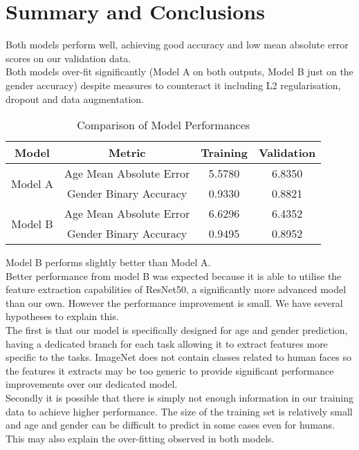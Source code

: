 \section{Summary and Conclusions}
Both models perform well, achieving good accuracy and low mean absolute error scores on our validation data.\\
Both models over-fit significantly (Model A on both outputs, Model B just on the gender accuracy) despite measures to counteract it including L2 regularisation, dropout and data augmentation.

\begin{table}[h!]
    \centering
    \begin{tabular}[h]{c|c|c|c}
        \hline
        Model & Metric & Training & Validation \\
        \hline
        \multirow{2}{4em}{Model A} & Age Mean Absolute Error & 5.5780 & 6.8350 \\
        \cline{2-4}
        & Gender Binary Accuracy & 0.9330 & 0.8821 \\
        \hline
        \multirow{2}{4em}{Model B} & Age Mean Absolute Error & 6.6296 & 6.4352 \\
        \cline{2-4}
        & Gender Binary Accuracy & 0.9495 & 0.8952 \\
        \hline
    \end{tabular}
    \caption{\label{tab:ModelPerformanceComparision}Comparison of Model Performances}
\end{table}

Model B performs slightly better than Model A. \\
Better performance from model B was expected because it is able to utilise the feature extraction capabilities of ResNet50, a significantly more advanced model than our own.
However the performance improvement is small. We have several hypotheses to explain this. \\
The first is that our model is specifically designed for age and gender prediction, having a dedicated branch for each task allowing it to extract features more specific to the tasks. ImageNet does not contain classes related to human faces so the features it extracts may be too generic to provide significant performance improvements over our dedicated model.\\
Secondly it is possible that there is simply not enough information in our training data to achieve higher performance. The size of the training set is relatively small and age and gender can be difficult to predict in some cases even for humans. This may also explain the over-fitting observed in both models.
